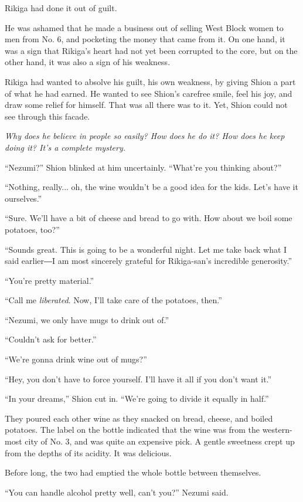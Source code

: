 Rikiga had done it out of guilt.

He was ashamed that he made a business out of selling West Block women
to men from No. 6, and pocketing the money that came from it. On one
hand, it was a sign that Rikiga's heart had not yet been corrupted to
the core, but on the other hand, it was also a sign of his weakness.

Rikiga had wanted to absolve his guilt, his own weakness, by giving
Shion a part of what he had earned. He wanted to see Shion's carefree
smile, feel his joy, and draw some relief for himself. That was all
there was to it. Yet, Shion could not see through this facade.

\emph{Why does he believe in people so easily? How does he do it?
How does he keep doing it? It's a complete mystery.}

``Nezumi?'' Shion blinked at him uncertainly. ``What're you thinking
about?''

``Nothing, really... oh, the wine wouldn't be a good idea for the kids.
Let's have it ourselves.''

``Sure. We'll have a bit of cheese and bread to go with. How about we
boil some potatoes, too?''

``Sounds great. This is going to be a wonderful night. Let me take back
what I said earlier―I am most sincerely grateful for Rikiga-san's
incredible generosity.''

``You're pretty material.''

``Call me \emph{liberated}. Now, I'll take care of the potatoes, then.''

``Nezumi, we only have mugs to drink out of.''

``Couldn't ask for better.''

``We're gonna drink wine out of mugs?''

``Hey, you don't have to force yourself. I'll have it all if you don't
want it.''

``In your dreams,'' Shion cut in. ``We're going to divide it equally in
half.''

They poured each other wine as they snacked on bread, cheese, and boiled
potatoes. The label on the bottle indicated that the wine was from the
western-most city of No. 3, and was quite an expensive pick. A gentle
sweetness crept up from the depths of its acidity. It was delicious.

Before long, the two had emptied the whole bottle between themselves.

``You can handle alcohol pretty well, can't you?'' Nezumi said.

